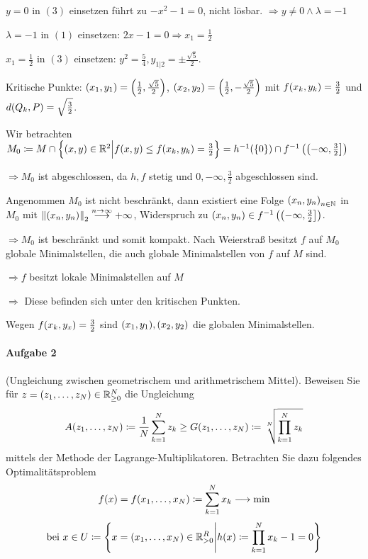 \documentclass{scrreprt}
\begin{document}
$y = 0$ in $\hyperref[eq:1-3]{(3)}$ einsetzen führt zu $-x^2 - 1 = 0$, nicht lösbar.
$\Rightarrow y \ne 0 \land \lambda = -1$

$\lambda = -1$ in $(1)$ einsetzen: $2x - 1 = 0 \Rightarrow x_1 = \frac{1}{2}$

$x_1 = \frac{1}{2}$ in $\hyperref[eq:1-3]{(3)}$ einsetzen:
$y^2 = \frac{5}{4}, y_{1|2} = \pm \frac{\sqrt{5}}{2}$.

Kritische Punkte: $\qty(x_1, y_1) = \qty(\frac{1}{2}, \frac{\sqrt{5}}{2})$,
$\qty(x_2, y_2) = \qty(\frac{1}{2}, - \frac{\sqrt{5}}{2})$ mit
$f\qty(x_k, y_k) = \frac{3}{2}$ und $d\qty(Q_k, P) = \sqrt{\frac{3}{2}}$.

Wir betrachten
$M_0 \coloneqq M \cap \qty{(x,y) \in \mathbb{R}^2 {\Big |}
  f(x, y) \leq f\qty(x_k, y_k) = \frac{3}{2}}
= h^{-1}(\qty{0}) \cap f^{-1}\left( \left(-\infty, \frac{3}{2}\right] \right)$

$\Rightarrow M_0$ ist abgeschlossen, da $h, f$ stetig und
${0}, {-\infty, \frac{3}{2}}$ abgeschlossen sind.

Angenommen $M_0$ ist nicht beschränkt, dann existiert eine Folge
$\qty(x_n, y_n)_{n \in \mathbb{N}}$ in $M_0$ mit
$\norm{\qty(x_n, y_n)}_2 \overset{n \to \infty}{\longrightarrow} +\infty$,
Widerspruch zu
$\qty(x_n, y_n) \in f^{-1}\left(\left(-\infty, \frac{3}{2}\right]\right)$.

$\Rightarrow M_0$ ist beschränkt und somit kompakt. Nach Weierstraß besitzt
$f$ auf $M_0$ globale Minimalstellen, die auch globale Minimalstellen von
$f$ auf $M$ sind.

$\Rightarrow f$ besitzt lokale Minimalstellen auf $M$

$\Rightarrow$ Diese befinden sich unter den kritischen Punkten.

Wegen $f\qty(x_k, y_x) = \frac{3}{2}$ sind $\qty(x_1, y_1), \qty(x_2, y_2)$
die globalen Minimalstellen.

\newpage
\paragraph{Aufgabe 2} (Ungleichung zwischen geometrischem und arithmetrischem
Mittel).
Beweisen Sie für $z = \qty(z_1, \ldots, z_N) \in \mathbb{R}_{\geq 0}^N$ die
Ungleichung
\[
  A\qty(z_1, \ldots, z_N) \coloneqq \frac{1}{N} \sum_{k = 1}^N z_k \geq
  G\qty(z_1, \ldots, z_N) \coloneqq \sqrt[N]{\prod_{k = 1}^N z_k}
\]
mittels der Methode der Lagrange-Multiplikatoren.
Betrachten Sie dazu folgendes Optimalitätsproblem
\[
  f(x) = f\qty(x_1, \ldots, x_N) \coloneqq \sum_{k = 1}^N x_k \longrightarrow \min
\]
\[
  \text{bei } x \in U \coloneqq \qty{x = \qty(x_1, \ldots, x_N) \in \mathbb{R}^R_{> 0}
    \middle | h(x) \coloneqq \prod_{k = 1}^N x_k - 1 = 0
  }
\]
\end{document}
